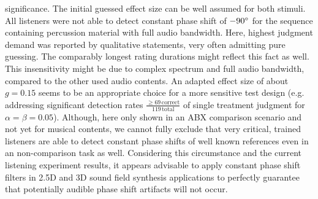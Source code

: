 significance.
The initial guessed effect size can be well assumed for both
stimuli.
%
\NewL All listeners were not able to detect constant phase shift of $-90\degree$
for the sequence containing percussion material with full audio bandwidth.
%
Here, highest judgment demand was reported by qualitative statements, very
often admitting pure guessing.
%
The comparably longest rating durations might reflect this fact as well.
%
This insensitivity might be due to complex spectrum and full audio bandwidth,
compared to the other used audio contents.
%
An adapted effect size of about $g=0.15$ seems to be an appropriate choice for
a more sensitive test design (e.g. addressing significant detection rates
$\frac{\geq 69\,\text{correct}}{119\,\text{total}}$ of single treatment
judgment for $\alpha=\beta=0.05$).
%
\NewL Although, here only shown in an ABX comparison scenario and not yet for
musical contents, we cannot fully exclude that
very critical, trained listeners are able to detect constant phase shifts of
well known references even in an non-comparison task as well.
%
Considering this circumstance and the current listening experiment results,
it appears advisable to apply constant phase shift filters in 2.5D and 3D sound
field synthesis applications to perfectly guarantee that
potentially audible phase shift artifacts will not occur.
